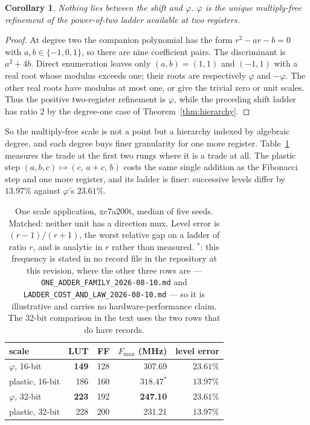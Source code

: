 \documentclass[11pt]{article}
\newtheorem{corollary}{Corollary}
\theoremstyle{definition}
\begin{document}
\begin{corollary}\label{cor:nothing-between}
Nothing lies between the shift and $\varphi$. $\varphi$ is the unique
multiply-free refinement of the power-of-two ladder available at two registers.
\end{corollary}
\begin{proof}
At degree two the companion polynomial has the form
$r^2-ar-b=0$ with $a,b\in\{-1,0,1\}$, so there are nine coefficient pairs.
The discriminant is $a^2+4b$.  Direct enumeration leaves only
$(a,b)=(1,1)$ and $(-1,1)$ with a real root whose modulus exceeds one;
their roots are respectively $\varphi$ and $-\varphi$.  The other real
roots have modulus at most one, or give the trivial zero or unit scales.
Thus the positive two-register refinement is $\varphi$, while the preceding
shift ladder has ratio $2$ by the degree-one case of
Theorem~\ref{thm:hierarchy}.
\end{proof}

So the multiply-free scale is not a point but a hierarchy indexed by algebraic
degree, and each degree buys finer granularity for one more register.
Table~\ref{tab:hierarchy} measures the trade at the first two rungs where it is
a trade at all. The plastic step
$(a,b,c)\mapsto(c,\,a+c,\,b)$ costs the same single addition as the Fibonacci
step and one more register, and its ladder is finer: successive levels differ by
$13.97\%$ against $\varphi$'s $23.61\%$.

\begin{table}[t]\centering
\caption{One scale application, xc7a200t, median of five seeds. Matched: neither
unit has a direction mux. Level error is $(r-1)/(r+1)$, the worst relative gap
on a ladder of ratio $r$, and is analytic in $r$ rather than measured. $^{\ast}$:
this frequency is stated in no record file in the repository at this revision,
where the other three rows are ---
\texttt{ONE\_ADDER\_FAMILY\_2026-08-10.md} and
\texttt{LADDER\_COST\_AND\_LAW\_2026-08-10.md} --- so it is illustrative and carries
no hardware-performance claim. The 32-bit comparison in the text uses the two rows
that do have records.}
\label{tab:hierarchy}
\begin{tabular}{lrrrr}
\toprule
scale & LUT & FF & $F_{\max}$ (MHz) & level error \\
\midrule
$\varphi$, 16-bit          & \textbf{149} & 128 & 307.69 & $23.61\%$ \\
plastic, 16-bit            & 186 & 160 & $318.47^{\ast}$ & $\mathbf{13.97\%}$ \\
\addlinespace
$\varphi$, 32-bit          & \textbf{223} & 192 & \textbf{247.10} & $23.61\%$ \\
plastic, 32-bit            & 228 & 200 & 231.21 & $\mathbf{13.97\%}$ \\
\bottomrule
\end{tabular}
\end{table}
\end{document}
